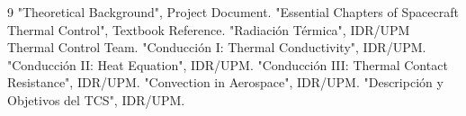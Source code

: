 \documentclass[12pt,a4paper]{report}
\begin{document}
\begin{thebibliography}{9}
 "Theoretical Background", Project Document.
 "Essential Chapters of Spacecraft Thermal Control", Textbook Reference.
 "Radiación Térmica", IDR/UPM Thermal Control Team.
 "Conducción I: Thermal Conductivity", IDR/UPM.
 "Conducción II: Heat Equation", IDR/UPM.
 "Conducción III: Thermal Contact Resistance", IDR/UPM.
 "Convection in Aerospace", IDR/UPM.
 "Descripción y Objetivos del TCS", IDR/UPM.
\end{thebibliography}
\end{document}
